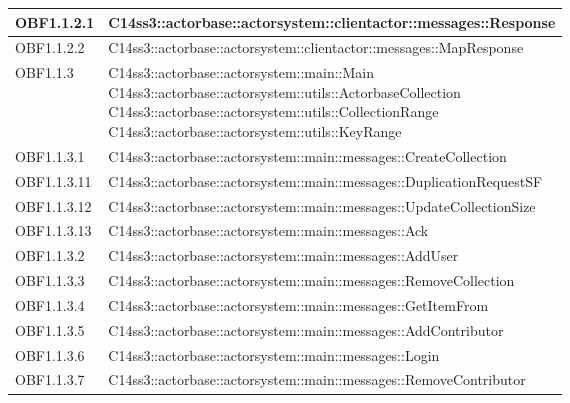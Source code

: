 \documentclass{scalatekids-article}
\begin{document}
\begin{longtable}[H]{|p{4.5cm}|p{13cm}|}
\hline
OBF1.1.2.1 & \multiLineCell[t]{C14ss3::actorbase::actorsystem::clientactor::messages::Response\\}\\
\hline
OBF1.1.2.2 & \multiLineCell[t]{C14ss3::actorbase::actorsystem::clientactor::messages::MapResponse\\}\\
\hline
OBF1.1.3 & \multiLineCell[t]{C14ss3::actorbase::actorsystem::main::Main\\C14ss3::actorbase::actorsystem::utils::ActorbaseCollection\\C14ss3::actorbase::actorsystem::utils::CollectionRange\\C14ss3::actorbase::actorsystem::utils::KeyRange\\}\\
\hline
OBF1.1.3.1 & \multiLineCell[t]{C14ss3::actorbase::actorsystem::main::messages::CreateCollection\\}\\
\hline
OBF1.1.3.11 & \multiLineCell[t]{C14ss3::actorbase::actorsystem::main::messages::DuplicationRequestSF\\}\\
\hline
OBF1.1.3.12 & \multiLineCell[t]{C14ss3::actorbase::actorsystem::main::messages::UpdateCollectionSize\\}\\
\hline
OBF1.1.3.13 & \multiLineCell[t]{C14ss3::actorbase::actorsystem::main::messages::Ack\\}\\
\hline
OBF1.1.3.2 & \multiLineCell[t]{C14ss3::actorbase::actorsystem::main::messages::AddUser\\}\\
\hline
OBF1.1.3.3 & \multiLineCell[t]{C14ss3::actorbase::actorsystem::main::messages::RemoveCollection\\}\\
\hline
OBF1.1.3.4 & \multiLineCell[t]{C14ss3::actorbase::actorsystem::main::messages::GetItemFrom\\}\\
\hline
OBF1.1.3.5 & \multiLineCell[t]{C14ss3::actorbase::actorsystem::main::messages::AddContributor\\}\\
\hline
OBF1.1.3.6 & \multiLineCell[t]{C14ss3::actorbase::actorsystem::main::messages::Login\\}\\
\hline
OBF1.1.3.7 & \multiLineCell[t]{C14ss3::actorbase::actorsystem::main::messages::RemoveContributor\\}\\

\end{longtable}
\end{document}
